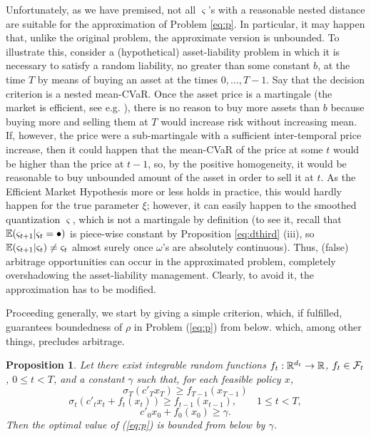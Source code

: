 \documentclass{article}              %
\newtheorem{proposition}{Proposition}
\begin{document}
Unfortunately, as we have premised, not all $\varsigma$'s with a reasonable nested distance
are suitable for the approximation of Problem \ref{eq:p}. In particular,
it may happen that, unlike the original problem, the approximate
version is unbounded. To illustrate this, consider a (hypothetical)
asset-liability problem in which it is necessary to satisfy a random 
liability, no greater than some constant $b$, at the time $T$ by means of buying an asset at the times
$0,\dots,T-1$. Say that the decision criterion is a nested mean-CVaR.
Once the asset price is a martingale (the market is efficient, see
e.g. \cite{Cuthbertson97}), there is no reason to buy more assets
than $b$ because buying more and selling them at $T$ would increase
risk without increasing mean. If, however, the price were
a sub-martingale with a sufficient inter-temporal price increase, then
it could happen that the mean-CVaR of the price at some $t$ would
be higher than the price at $t-1$, so, by the positive homogeneity,
it would be reasonable to buy unbounded amount of the asset in order
to sell it at $t$. As the Efficient Market Hypothesis more or less
holds in practice, this would hardly happen for the true parameter $\xi$; however, it
can easily happen to the smoothed quantization $\varsigma$, which
is not a martingale by definition (to see it, recall that $\mathbb{E}(\varsigma_{t+1}|\varsigma_t=\bullet)$
is piece-wise constant by Proposition \ref{eq:dthird} (iii), so $\mathbb{E}(\varsigma_{t+1}|\varsigma_{t})\neq\varsigma_{t}$
almost surely once $\omega$'s are absolutely continuous). Thus, (false) arbitrage opportunities can occur in
the approximated problem, completely overshadowing the asset-liability
management. Clearly, to avoid it, the approximation has to be modified.

Proceeding generally, we start by giving a simple criterion, which,
if fulfilled, guarantees boundedness of $\rho$ in Problem (\ref{eq:p})
from below. which, among other things, precludes arbitrage.

\begin{proposition}
\label{cor:feas} Let there exist integrable random functions $f_{t}:\mathbb{R}^{d_{t}}\rightarrow\mathbb{R}$, $f_t \in \mathcal{F}_t$,
$0\leq t<T$, and a constant $\gamma$ such that, for each feasible
policy $x$, 
\begin{equation}\label{eq:f1}
\sigma_T(c'{}_{T}x_{T})\geq f_{T-1}(x_{T-1})
\end{equation}
\begin{equation}\label{eq:f2}
\sigma_t(c'{}_{t}x_{t}+f_{t}(x_{t}))\geq f_{t-1}(x_{t-1}),\qquad1\leq t< T,
\end{equation}
\begin{equation}\label{eq:f3}
c'_{0}x_{0}+f_{0}(x_{0})\geq\gamma.
\end{equation}
Then the optimal value of (\ref{eq:p}) is bounded from below by $\gamma$.

\end{proposition}
\end{document}
